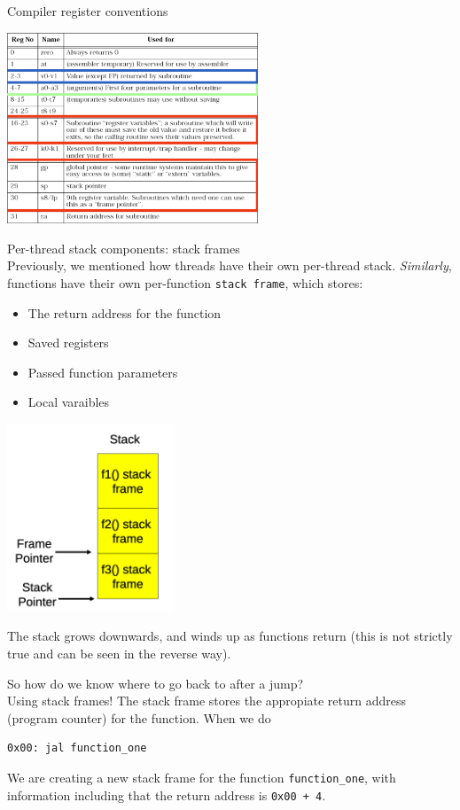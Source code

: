 \documentclass[journal, letterpaper]{IEEEtran}
\begin{document}
\newpage
\begin{aside}{Compiler register conventions}
    \begin{center}
        \includegraphics[width=7.5cm]{./photos/compiler_register_conventions.png}
    \end{center}
\end{aside}
\begin{theory}{Per-thread stack components: stack frames} \\
    Previously, we mentioned how threads have their own per-thread stack. \textit{Similarly}, functions have their own per-function \verb|stack frame|, which stores:
    \begin{itemize}
        \item The return address for the function
        \item Saved registers
        \item Passed function parameters
        \item Local varaibles
    \end{itemize}
    \begin{center}
        \includegraphics[width=5cm]{./photos/stack_frame.png}
    \end{center}
    The stack grows downwards, and winds up as functions return (this is not strictly true and can be seen in the reverse way).
\end{theory}
\begin{aside}{So how do we know where to go back to after a jump?} \\
    Using stack frames! The stack frame stores the appropiate return address (program counter) for the function. When we do
    \begin{verbatim}
0x00: jal function_one
    \end{verbatim}
    We are creating a new stack frame for the function \verb|function_one|, with information including that the return address is \verb|0x00 + 4|.
\end{aside}
\end{document}
